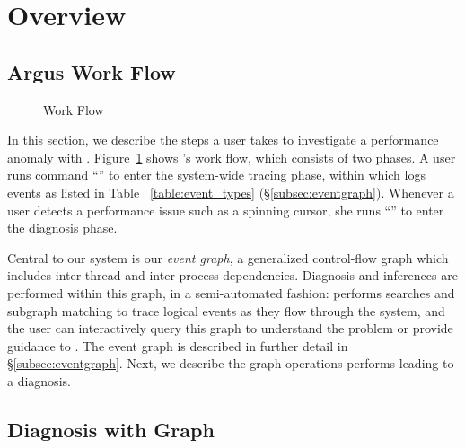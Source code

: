\section{Overview}\label{sec:overview}

\subsection{Argus Work Flow}
\begin{figure}[tb]
    \centering
    
    \caption{\xxx Work Flow}
    \label{fig:argus-overview}
\end{figure}

In this section, we describe the steps a user takes to investigate a performance
anomaly with \xxx. Figure~\ref{fig:argus-overview} shows \xxx's work flow, which
consists of two phases. A user runs command ``'' to enter the
system-wide tracing phase, within which \xxx logs events as listed in Table
~\ref{table:event_types} (\S\ref{subsec:eventgraph}). Whenever a user detects
a performance issue such as a spinning cursor, she runs ``'' to
enter the diagnosis phase.


Central to our system is our \emph{event graph}, a generalized control-flow
graph which includes inter-thread and inter-process dependencies. Diagnosis
and inferences are performed within this graph, in a semi-automated fashion:
\xxx performs searches and subgraph matching to trace logical events as they
flow through the system, and the user can interactively query this graph to
understand the problem or provide guidance to \xxx. The event graph is described
in further detail in \S\ref{subsec:eventgraph}. Next, we describe the graph
operations \xxx performs leading to a diagnosis.

\subsection{Diagnosis with Graph}\label{subsec:debug}

